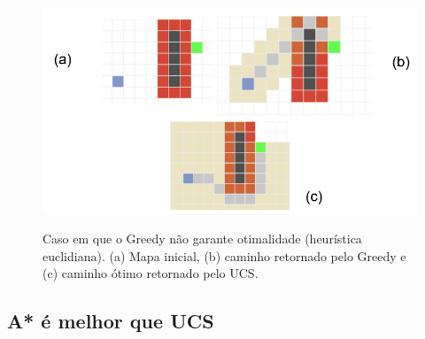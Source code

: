 \documentclass[letterpaper]{article} %
\begin{document}
\begin{figure}[htb]
	\centering 
    \caption{Caso em que o Greedy não garante otimalidade (heurística euclidiana). (a) Mapa inicial, (b)
	caminho retornado pelo Greedy e (c) caminho ótimo retornado pelo UCS.}
	\includegraphics[width=\columnwidth]{images/greedy_nao_otimo.png}
	\label{fig:greedy_nao_otimo}
\end{figure}


\subsection{A* é melhor que UCS}
\end{document}
